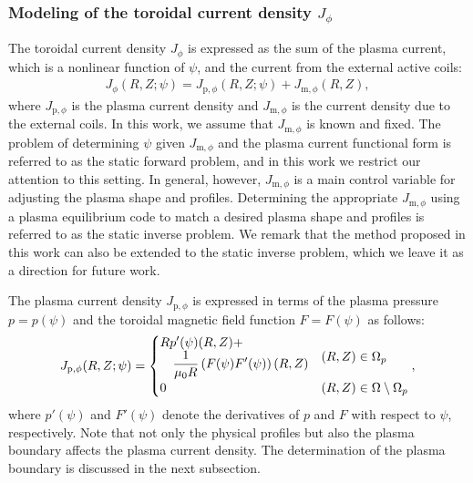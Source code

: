 \subsubsection{Modeling of the toroidal current density $J_\phi$}

The toroidal current density $J_\phi$ is expressed as the sum of the plasma current,
which is a nonlinear function of $\psi$, and the current from the external active coils:
\begin{align}
  J_\phi(R, Z; \psi) = J_{\text{p}, \phi}(R, Z; \psi) + J_{\text{m}, \phi}(R, Z),
\end{align}
where $J_{\text{p}, \phi}$ is the plasma current density and 
$J_{\text{m}, \phi}$ is the current density due to the external coils. 
In this work, we assume that $J_{\text{m}, \phi}$ is known and fixed.
The problem of determining $\psi$ given $J_{\text{m},\phi}$ and the 
plasma current functional form is referred to as the 
static forward problem, 
and in this work we restrict our attention to this setting.
In general, however, $J_{\text{m}, \phi}$ is a main control variable 
for adjusting the plasma shape and profiles.
Determining the appropriate $J_{\text{m}, \phi}$ using a plasma equilibrium code
to match a desired plasma shape and profiles is referred to as the static inverse problem.
We remark that the method proposed in this work can also be extended to 
the static inverse problem, which we leave it as a direction for future work.

The plasma current density $J_{\text{p}, \phi}$ is expressed in terms of the 
plasma pressure $p = p(\psi)$ and the toroidal magnetic field function $F = F(\psi)$
as follows:
\begin{align}\label{eq:3}
  J_{\text{p}, \phi}(R, Z; \psi) = \begin{cases}
  \begin{aligned}
  & R p'(\psi)(R, Z) + \\
  & \quad \frac{1}{\mu_0 R} \left(F(\psi)F'(\psi)\right)(R, Z)
  \end{aligned} &  (R, Z) \in \Omega_p \\
  0 & (R, Z) \in \Omega \setminus \Omega_p
\end{cases}, \end{align}
where $p'(\psi)$ and $F'(\psi)$ denote the derivatives of $p$ and $F$ with respect to $\psi$, respectively. 
Note that not only the physical profiles but also the plasma boundary 
affects the plasma current density.
The determination of the plasma boundary is discussed in the next subsection.

